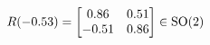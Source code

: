 \documentclass[preview]{standalone}
\begin{document}
\begin{align*}
\special{dvisvgm:raw <g id='unique000'>}R(-0.53) = \begin{bmatrix} 0.86 & 0.51 \\ -0.51 & 0.86 \end{bmatrix} \in \text{SO}(2)\special{dvisvgm:raw </g>}
\end{align*}
\end{document}
